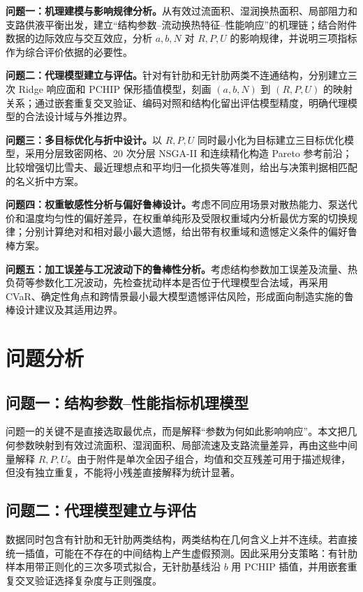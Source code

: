 \documentclass[12pt,a4paper]{article}
\begin{document}
\textbf{问题一：机理建模与影响规律分析。}从有效过流面积、湿润换热面积、局部阻力和支路供液平衡出发，建立“结构参数--流动换热特征--性能响应”的机理链；结合附件数据的边际效应与交互效应，分析 $a,b,N$ 对 $R,P,U$ 的影响规律，并说明三项指标作为综合评价依据的必要性。

\textbf{问题二：代理模型建立与评估。}针对有针肋和无针肋两类不连通结构，分别建立三次 Ridge 响应面和 PCHIP 保形插值模型，刻画 $(a,b,N)$ 到 $(R,P,U)$ 的映射关系；通过嵌套重复交叉验证、编码对照和结构化留出评估模型精度，明确代理模型的合法设计域与外推边界。

\textbf{问题三：多目标优化与折中设计。}以 $R,P,U$ 同时最小化为目标建立三目标优化模型，采用分层致密网格、20 次分层 NSGA-II 和连续精化构造 Pareto 参考前沿；比较增强切比雪夫、最近理想点和平均归一化损失等准则，给出与决策判据相匹配的名义折中方案。

\textbf{问题四：权重敏感性分析与偏好鲁棒设计。}考虑不同应用场景对散热能力、泵送代价和温度均匀性的偏好差异，在权重单纯形及受限权重域内分析最优方案的切换规律；分别计算绝对和相对最小最大遗憾，给出带有权重域和遗憾定义条件的偏好鲁棒方案。

\textbf{问题五：加工误差与工况波动下的鲁棒性分析。}考虑结构参数加工误差及流量、热负荷等参数化工况波动，先检查扰动样本是否位于代理模型合法域，再采用 CVaR、确定性角点和跨情景最小最大模型遗憾评估风险，形成面向制造实施的鲁棒设计建议及其适用边界。

\section{问题分析}
\subsection{问题一：结构参数–性能指标机理模型}
问题一的关键不是直接选取最优点，而是解释“参数为何如此影响响应”。本文把几何参数映射到有效过流面积、湿润面积、局部流速及支路流量差异，再由这些中间量解释 $R,P,U$。由于附件是单次全因子组合，均值和交互残差可用于描述规律，但没有独立重复，不能将小残差直接解释为统计显著。

\subsection{问题二：代理模型建立与评估}
数据同时包含有针肋和无针肋两类结构，两类结构在几何含义上并不连续。若直接统一插值，可能在不存在的中间结构上产生虚假预测。因此采用分支策略：有针肋样本用带正则化的三次多项式拟合，无针肋基线沿 $b$ 用 PCHIP 插值，并用嵌套重复交叉验证选择复杂度与正则强度。
\end{document}
